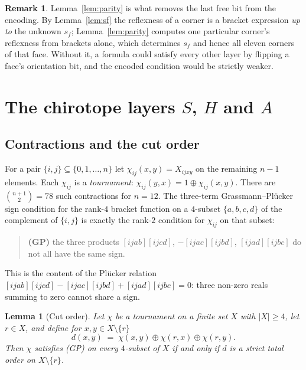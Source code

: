 \documentclass[11pt,reqno]{amsart}
\theoremstyle{plain}
\newtheorem{lemma}[theorem]{Lemma}
\theoremstyle{definition}
\newtheorem{remark}[theorem]{Remark}
\newcommand{\bra}[1]{[#1]}
\newcommand{\xor}{\oplus}
\begin{document}
\begin{remark}
Lemma~\ref{lem:parity} is what removes the last free bit from the encoding. By Lemma~\ref{lem:sf} the
reflexness of a corner is a bracket expression \emph{up to} the unknown $s_f$; Lemma~\ref{lem:parity}
computes one particular corner's reflexness from brackets alone, which determines $s_f$ and hence all
eleven corners of that face. Without it, a formula could satisfy every other layer by flipping a
face's orientation bit, and the encoded condition would be strictly weaker.
\end{remark}

\section{The chirotope layers \texorpdfstring{$S$, $H$ and $A$}{S, H and A}}\label{sec:chirotope}

\subsection{Contractions and the cut order}
For a pair $\{i,j\}\subseteq\{0,1,\dots,n\}$ let $\chi_{ij}(x,y)=X_{ijxy}$ on the remaining $n-1$
elements. Each $\chi_{ij}$ is a \emph{tournament}: $\chi_{ij}(y,x)=1\xor\chi_{ij}(x,y)$. There are
$\binom{n+1}{2}=78$ such contractions for $n=12$. The three-term Grassmann--Plücker sign condition for
the rank-$4$ bracket function on a $4$-subset $\{a,b,c,d\}$ of the complement of $\{i,j\}$ is exactly
the rank-$2$ condition for $\chi_{ij}$ on that subset:

\begin{quote}
\textbf{(GP)} the three products $\bra{ijab}\bra{ijcd}$, $-\bra{ijac}\bra{ijbd}$, $\bra{ijad}\bra{ijbc}$
do not all have the same sign.
\end{quote}

This is the content of the Plücker relation
$\bra{ijab}\bra{ijcd}-\bra{ijac}\bra{ijbd}+\bra{ijad}\bra{ijbc}=0$: three non-zero reals summing to
zero cannot share a sign.

\begin{lemma}[Cut order]\label{lem:cutorder}
Let $\chi$ be a tournament on a finite set $X$ with $|X|\ge4$, let $r\in X$, and define for
$x,y\in X\setminus\{r\}$
\[
    d(x,y)\;=\;\chi(x,y)\xor\chi(r,x)\xor\chi(r,y).
\]
Then $\chi$ satisfies \textup{(GP)} on every $4$-subset of $X$ if and only if $d$ is a strict total
order on $X\setminus\{r\}$.
\end{lemma}
\end{document}
